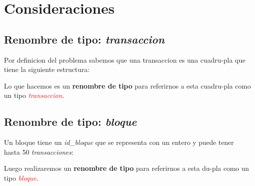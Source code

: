 \documentclass[10pt,a4paper]{article}
\begin{document}
\maketitle

\section{Consideraciones}
\subsection{Renombre de tipo: \textit{transaccion}}
Por definicion del problema sabemos que una transaccion es una cuadru-pla que tiene la siguiente estructura:

\vspace{0.3cm}
\noindent
{}
\vspace{0.1cm}

Lo que hacemos es un \textbf{renombre de tipo} para referirnos a esta cuadru-pla como un tipo \textcolor{red}{\textit{transaccion}}.

\subsection{Renombre de tipo: \textit{bloque}}
Un bloque tiene un \textit{id\_bloque} que se representa con un entero y puede tener hasta 50 \textit{transacciones}:

\vspace{0.3cm}
\noindent
{}
\vspace{0.1cm}

Luego realizaremos un \textbf{renombre de tipo} para referirnos a esta du-pla como un tipo \textcolor{red}{\textit{bloque}}.

\vspace{0.3cm}

\noindent
{}
\end{document}
